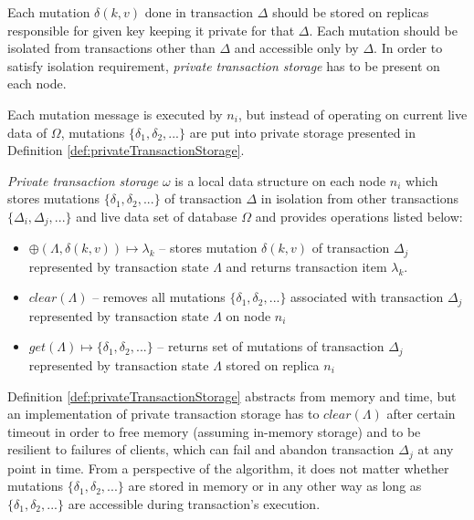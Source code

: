 \documentclass[runningheads,a4paper]{llncs}
\newcommand{\transaction}{$\Delta$\xspace}
\newcommand{\transactionj}{$\Delta_{j}$\xspace}
\newcommand{\transactions}{$\{\Delta_{i}, \Delta_{j}, ...\}$\xspace}
\newcommand{\database}{$\Omega$\xspace}
\newcommand{\mutation}[2]{$\delta(#1, #2)$\xspace}
\newcommand{\mutations}{$\{\delta_{1}, \delta_{2}, ...\}$\xspace}
\newcommand{\txItemi}[1]{$\lambda_{#1}$\xspace}
\newcommand{\txState}{$\Lambda$\xspace}
\newcommand{\txStorage}{$\omega$\xspace}
\newcommand{\node}[1]{$n_{#1}$\xspace}
\begin{document}
Each mutation \mutation{k}{v} done in transaction \transaction should be stored on replicas responsible for given key keeping it private for that \transaction. Each mutation should be isolated from transactions other than \transaction and accessible only by \transaction. In order to satisfy isolation requirement, \emph{private transaction storage} has to be present on each node. 

Each mutation message is executed by \node{i}, but instead of operating on current live data of \database, mutations \mutations are put into private storage presented in Definition \ref{def:privateTransactionStorage}. 

\begin{definition}
  \label{def:privateTransactionStorage}
  \emph{Private transaction storage} \txStorage is a local data structure on each node \node{i} which stores mutations \mutations of transaction \transaction in isolation from other transactions \transactions and live data set of database \database and provides operations listed below: 
  \begin{itemize}
    \item $\oplus(\text{\txState}, \text{\mutation{k}{v}}) \mapsto \text{\txItemi{k}}$ -- stores mutation \mutation{k}{v} of transaction \transactionj represented by transaction state \txState and returns transaction item \txItemi{k}. 
    \item $\mathit{clear}(\text{\txState})$ -- removes all mutations \mutations associated with transaction \transactionj represented by transaction state \txState on node \node{i}
    \item $\mathit{get}(\text{\txState}) \mapsto \text{\mutations}$ -- returns set of mutations of transaction \transactionj represented by transaction state \txState stored on replica \node{i} 
  \end{itemize}
\end{definition}

Definition \ref{def:privateTransactionStorage} abstracts from memory and time, but an implementation of private transaction storage has to $\mathit{clear}(\text{\txState})$ after certain timeout in order to free memory (assuming in-memory storage) and to be resilient to failures of clients, which can fail and abandon transaction \transactionj at any point in time. From a perspective of the algorithm, it does not matter whether mutations \mutations are stored in memory or in any other way as long as \mutations are accessible during transaction's execution. 
\end{document}
